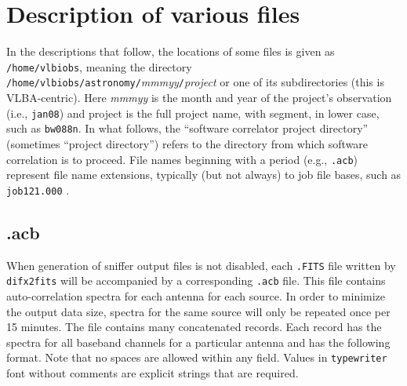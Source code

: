 

\section{Description of various files} \label{sec:files}

In the descriptions that follow, the locations of some files is given as {\tt /home/vlbiobs}, meaning the directory {\tt /home/vlbiobs/astronomy/}{\em mmmyy}{\tt /}{\em project} or one of its subdirectories (this is VLBA-centric).
Here {\em mmmyy} is the month and year of the project's observation (i.e., {\tt jan08}) and project is the full project name, with segment, in lower case, such as {\tt bw088n}.
In what follows, the ``software correlator project directory'' (sometimes ``project directory'') refers to the directory from which software correlation is to proceed.
File names beginning with a period (e.g., {\tt .acb}) represent file name extensions, typically (but not always) to job file bases, such as {\tt job121.000} .







\subsection{.acb} \label{sec:acb}

When generation of sniffer output files is not disabled, each {\tt .FITS} file written by {\tt difx2fits} will be accompanied by a corresponding {\tt .acb} file. 
This file contains auto-correlation spectra for each antenna for each source.
In order to minimize the output data size, spectra for the same source will only be repeated once per 15 minutes.
The file contains many concatenated records.
Each record has the spectra for all baseband channels for a particular antenna and has the following format.  
Note that no spaces are allowed within any field.
Values in {\tt typewriter} font without comments are explicit strings that are required.

